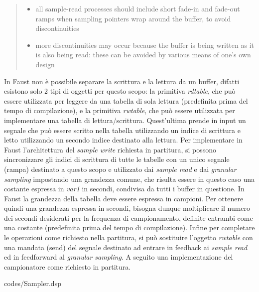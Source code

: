 \begin{quote}
    \begin{itemize}
      \item all sample-read processes 
      should include short fade-in and fade-out
      ramps when sampling pointers wrap around the buffer, to avoid
      discontinuities
      \item more discontinuities may occur because the buffer is being written
      as it is also being read: these can be avoided by various means of
      one's own design
    \end{itemize}
\end{quote}

In Faust non è possibile separare la scrittura e la lettura da un buffer,
difatti esistono solo 2 tipi di oggetti per questo scopo:
la primitiva \textit{rdtable}, che può essere utilizzata per leggere da una tabella di sola lettura 
(predefinita prima del tempo di compilazione),
e la primitiva \textit{rwtable}, che può essere utilizzata per implementare una tabella di lettura/scrittura. 
Quest'ultima prende in input un segnale che può essere scritto nella tabella utilizzando un indice di scrittura e 
letto utilizzando un secondo indice destinato alla lettura.
Per implementare in Faust l'architettura del \textit{sample write} richiesta in partitura, 
si possono sincronizzare gli indici di scrittura di tutte le tabelle con un unico 
segnale (rampa) destinato a questo scopo e utilizzato dai \textit{sample read} e dai \textit{granular sampling} 
impostando una grandezza comune, che risulta essere in questo caso una costante espressa in \textit{var1} in secondi, 
condivisa da tutti i buffer in questione.
In Faust la grandezza della tabella deve essere espressa in campioni. Per ottenere quindi
una grandezza espressa in secondi, bisogna dunque moltiplicare il numero dei secondi desiderati per
la frequenza di campionamento, definite entrambi come una costante (predefinita prima del tempo di compilazione).
Infine per completare le operazioni come richiesto nella partitura, si può sostituire l'oggetto \textit{rwtable}
con una mandata (send) del segnale destinato ad entrare in feedback ai \textit{sample read} ed in
feedforward al \textit{granular sampling}.
A seguito una implementazione del campionatore come richiesto in partitura.

\vspace{0.5cm} 

{codes/Sampler.dsp}

